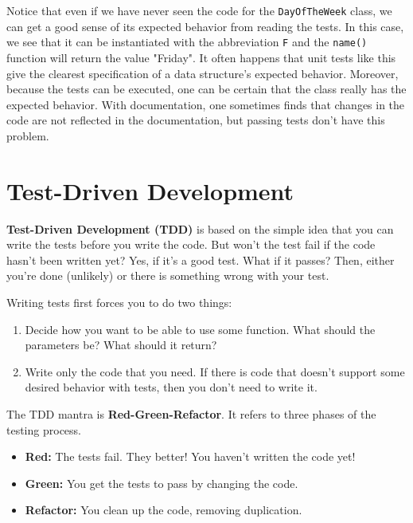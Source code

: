 \begin{Verbatim}
\end{Verbatim}


Notice that even if we have never seen the code for the \texttt{DayOfTheWeek} class, we can get a good sense of its expected behavior from reading the tests.  In this case, we see that it can be instantiated with the abbreviation \texttt{F} and the \texttt{name()} function will return the value "Friday".  It often happens that unit tests like this give the clearest specification of a data structure’s expected behavior.  Moreover, because the tests can be executed, one can be certain that the class really has the expected behavior.  With documentation, one sometimes finds that changes in the code are not reflected in the documentation, but passing tests don’t have this problem.

\section{Test-Driven Development}


\textbf{Test-Driven Development (TDD)} is based on the simple idea that you can write the tests before you write the code.  But won’t the test fail if the code hasn’t been written yet?  Yes, if it’s a good test.  What if it passes?  Then, either you’re done (unlikely) or there is something wrong with your test.


Writing tests first forces you to do two things:

\begin{enumerate}

\item Decide how you want to be able to use some function.  What should the parameters be?  What should it return?

\item Write only the code that you need.  If there is code that doesn’t support some desired behavior with tests, then you don’t need to write it.

\end{enumerate}

The TDD mantra is \textbf{Red-Green-Refactor}.  It refers to three phases of the testing process.

\begin{itemize}

\item \textbf{Red:} The tests fail.  They better!  You haven’t written the code yet!

\item \textbf{Green:} You get the tests to pass by changing the code.

\item \textbf{Refactor:} You clean up the code, removing duplication.

\end{itemize}

